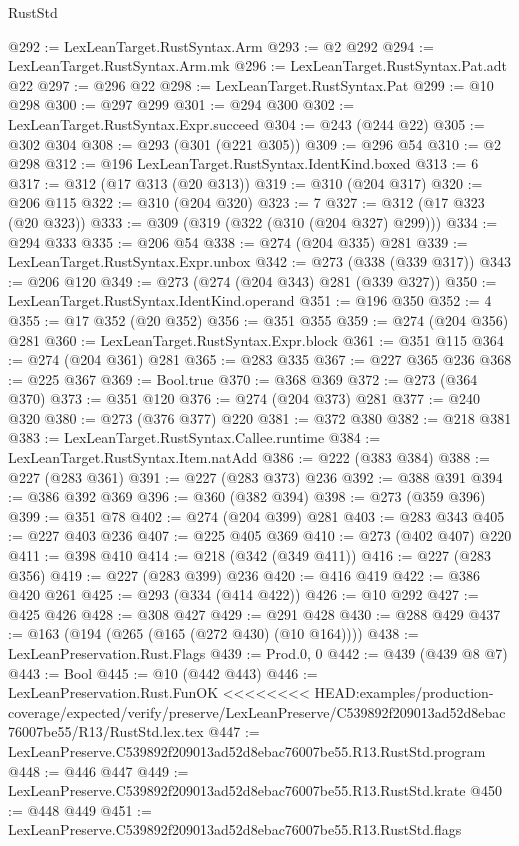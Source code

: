 \begin{lexlean}{RustStd}
\begin{coremodule}
{\begin{coremodule}
{{{{{{@292 := LexLeanTarget.RustSyntax.Arm
@293 := @2 @292
@294 := LexLeanTarget.RustSyntax.Arm.mk
@296 := LexLeanTarget.RustSyntax.Pat.adt @22
@297 := @296 @22
@298 := LexLeanTarget.RustSyntax.Pat
@299 := @10 @298
@300 := @297 @299
@301 := @294 @300
@302 := LexLeanTarget.RustSyntax.Expr.succeed
@304 := @243 (@244 @22)
@305 := @302 @304
@308 := @293 (@301 (@221 @305))
@309 := @296 @54
@310 := @2 @298
@312 := @196 LexLeanTarget.RustSyntax.IdentKind.boxed
@313 := 6
@317 := @312 (@17 @313 (@20 @313))
@319 := @310 (@204 @317)
@320 := @206 @115
@322 := @310 (@204 @320)
@323 := 7
@327 := @312 (@17 @323 (@20 @323))
@333 := @309 (@319 (@322 (@310 (@204 @327) @299)))
@334 := @294 @333
@335 := @206 @54
@338 := @274 (@204 @335) @281
@339 := LexLeanTarget.RustSyntax.Expr.unbox
@342 := @273 (@338 (@339 @317))
@343 := @206 @120
@349 := @273 (@274 (@204 @343) @281 (@339 @327))
@350 := LexLeanTarget.RustSyntax.IdentKind.operand
@351 := @196 @350
@352 := 4
@355 := @17 @352 (@20 @352)
@356 := @351 @355
@359 := @274 (@204 @356) @281
@360 := LexLeanTarget.RustSyntax.Expr.block
@361 := @351 @115
@364 := @274 (@204 @361) @281
@365 := @283 @335
@367 := @227 @365 @236
@368 := @225 @367
@369 := Bool.true
@370 := @368 @369
@372 := @273 (@364 @370)
@373 := @351 @120
@376 := @274 (@204 @373) @281
@377 := @240 @320
@380 := @273 (@376 @377) @220
@381 := @372 @380
@382 := @218 @381
@383 := LexLeanTarget.RustSyntax.Callee.runtime
@384 := LexLeanTarget.RustSyntax.Item.natAdd
@386 := @222 (@383 @384)
@388 := @227 (@283 @361)
@391 := @227 (@283 @373) @236
@392 := @388 @391
@394 := @386 @392 @369
@396 := @360 (@382 @394)
@398 := @273 (@359 @396)
@399 := @351 @78
@402 := @274 (@204 @399) @281
@403 := @283 @343
@405 := @227 @403 @236
@407 := @225 @405 @369
@410 := @273 (@402 @407) @220
@411 := @398 @410
@414 := @218 (@342 (@349 @411))
@416 := @227 (@283 @356)
@419 := @227 (@283 @399) @236
@420 := @416 @419
@422 := @386 @420 @261
@425 := @293 (@334 (@414 @422))
@426 := @10 @292
@427 := @425 @426
@428 := @308 @427
@429 := @291 @428
@430 := @288 @429
@437 := @163 (@194 (@265 (@165 (@272 @430) (@10 @164))))
@438 := LexLeanPreservation.Rust.Flags
@439 := Prod.{0, 0}
@442 := @439 (@439 @8 @7)
@443 := Bool
@445 := @10 (@442 @443)
@446 := LexLeanPreservation.Rust.FunOK
<<<<<<<< HEAD:examples/production-coverage/expected/verify/preserve/LexLeanPreserve/C539892f209013ad52d8ebac76007be55/R13/RustStd.lex.tex
@447 := LexLeanPreserve.C539892f209013ad52d8ebac76007be55.R13.RustStd.program
@448 := @446 @447
@449 := LexLeanPreserve.C539892f209013ad52d8ebac76007be55.R13.RustStd.krate
@450 := @448 @449
@451 := LexLeanPreserve.C539892f209013ad52d8ebac76007be55.R13.RustStd.flags
}}}}}}
\end{coremodule}}
\end{coremodule}
\end{lexlean}
